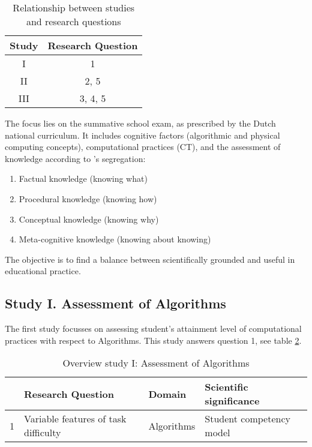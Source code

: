 \begin{table}
  \centering
\begin{tabular}{|c|c|}
  \hline
  \textbf{Study} & \textbf{Research Question}  \\
  \hline
    I & 1 \\ \hline
    II & 2, 5 \\ \hline
    III & 3, 4, 5 \\ \hline
\end{tabular}
\caption{Relationship between studies and research questions}\label{table:studiesVsQues}
\end{table}

The focus lies on the summative school exam, as prescribed by the Dutch national curriculum.
It includes cognitive factors (algorithmic and physical computing concepts), computational practices (CT), and the assessment of knowledge according to \citeauthor{streun2001kennis}'s segregation:
\begin{enumerate}
\item Factual knowledge (knowing what)
\item Procedural knowledge (knowing how)
\item Conceptual knowledge (knowing why)
\item Meta-cognitive knowledge (knowing about knowing)
\end{enumerate}
The objective is to find a balance between scientifically grounded and useful in educational practice.


\subsection{Study I. Assessment of Algorithms}

The first study focusses on assessing student's attainment level of computational practices with respect to Algorithms. This study answers question 1, see table \ref{table:StudyIresearchQues}.
\begin{table}
  \centering
\begin{tabular}{|c|l|l|l|}
   \hline
    &\textbf{Research Question} & \textbf{Domain} & \textbf{Scientific significance}\\
  \hline

  1 & Variable features of task difficulty &Algorithms &Student competency model \\
  \hline
\end{tabular}
\caption{Overview study I: Assessment of Algorithms}\label{table:StudyIresearchQues}
\end{table}


